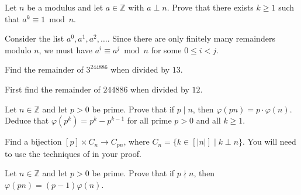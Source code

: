 \begin{exercise}
\label{exPowerModN}
Let $n$ be a modulus and let $a \in \mathbb{Z}$ with $a \perp n$. Prove that there exists $k \ge 1$ such that $a^k \equiv 1 \bmod n$.
\begin{backhint}
Consider the list $a^0, a^1, a^2, \dots$. Since there are only finitely many remainders modulo $n$, we must have $a^i \equiv a^j \bmod n$ for some $0 \le i < j$.
\end{backhint}
\end{exercise}


\begin{exercise}
\label{RemainderOfThreeExpBigRemThirteen}
Find the remainder of $3^{244886}$ when divided by $13$.
\begin{backhint}
First find the remainder of $244886$ when divided by $12$.
\end{backhint}
\end{exercise}


\begin{exercise}
\label{exTotientMultiplyByPrime}
Let $n \in \mathbb{Z}$ and let $p > 0$ be prime. Prove that if $p \mid n$, then $\varphi(pn) = p \cdot \varphi(n)$. Deduce that $\varphi(p^k) = p^k-p^{k-1}$ for all prime $p>0$ and all $k \ge 1$.
\begin{backhint}
Find a bijection $[p] \times C_n \to C_{pn}$, where $C_n = \{ k \in [|n|] \mid k \perp n \}$. You will need to use the techniques of  in your proof.
\end{backhint}
\end{exercise}


\begin{exercise}
Let $n \in \mathbb{Z}$ and let $p>0$ be prime. Prove that if $p \nmid n$, then $\varphi(pn)=(p-1)\varphi(n)$.
\end{exercise}



